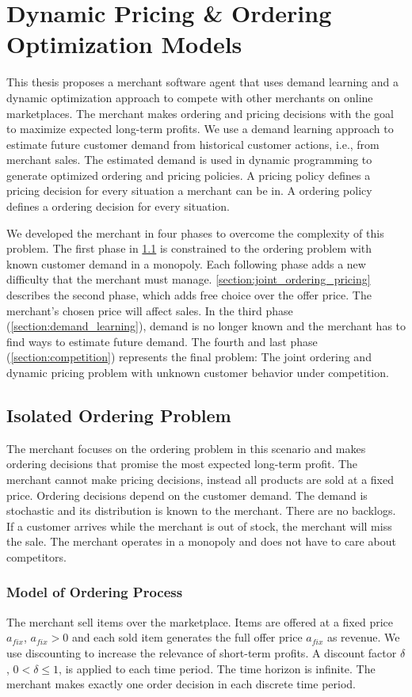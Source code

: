 
\chapter{Dynamic Pricing \& Ordering Optimization Models}
This thesis proposes a merchant software agent that uses demand learning and a dynamic optimization approach to compete with other merchants on online marketplaces.
The merchant makes ordering and pricing decisions with the goal to maximize expected long-term profits.
We use a demand learning approach to estimate future customer demand from historical customer actions, i.e., from merchant sales.
The estimated demand is used in dynamic programming to generate optimized ordering and pricing policies.
A pricing policy defines a pricing decision for every situation a merchant can be in. A ordering policy defines a ordering decision for every situation.

We developed the merchant in four phases to overcome the complexity of this problem.
The first phase in \cref{section:ordering} is constrained to the ordering problem with known customer demand in a monopoly.
Each following phase adds a new difficulty that the merchant must manage.
\cref{section:joint_ordering_pricing} describes the second phase, which adds free choice over the offer price.
The merchant's chosen price will affect sales.
In the third phase (\cref{section:demand_learning}), demand is no longer known and the merchant has to find ways to estimate future demand.
The fourth and last phase (\cref{section:competition}) represents the final problem: The joint ordering and dynamic pricing problem with unknown customer behavior under competition.

\section{Isolated Ordering Problem}
\label{section:ordering}
The merchant focuses on the ordering problem in this scenario and makes ordering decisions that promise the most expected long-term profit.
The merchant cannot make pricing decisions, instead all products are sold at a fixed price.
Ordering decisions depend on the customer demand.
The demand is stochastic and its distribution is known to the merchant.
There are no backlogs.
If a customer arrives while the merchant is out of stock, the merchant will miss the sale.
The merchant operates in a monopoly and does not have to care about competitors.

\subsection{Model of Ordering Process}
\label{subs:ordering_model}
The merchant sell items over the marketplace.
Items are offered at a fixed price $a_{fix}$, $a_{fix} > 0$ and each sold item generates the full offer price $a_{fix}$ as revenue.
We use discounting to increase the relevance of short-term profits.
A discount factor $\delta$, $0 < \delta \leq 1$, is applied to each time period.
The time horizon is infinite.
The merchant makes exactly one order decision in each discrete time period.

